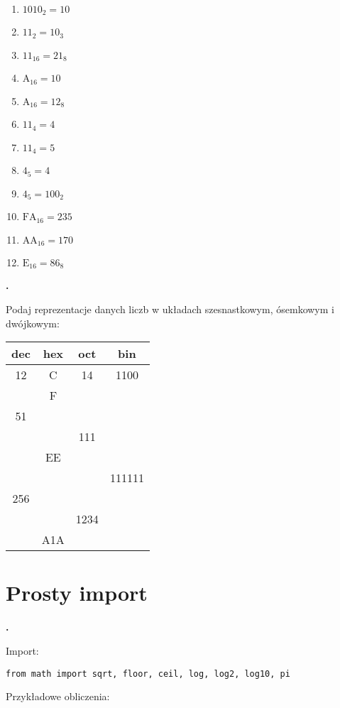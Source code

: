 \documentclass[a4paper]{article}
\begin{document}
\begin{multicols}{2}
\begin{enumerate}[label=\arabic*.]
    \item $1010_{2} = 10$
    \item $11_{2} = 10_{3}$
    \item $11_{16} = 21_{8}$
    \item $\mathrm{A_{16}} = 10$
    \item $\mathrm{A_{16}} = 12_{8}$

    \item $11_{4} = 4$
    \item $11_{4} = 5$
    \item $4_{5} = 4$
    \item $4_{5} = 100_{2}$

    \item $\mathrm{FA_{16}} = 235$
    \item $\mathrm{AA_{16}} = 170$
    \item $\mathrm{E_{16}} = 86_{8}$

\end{enumerate}
\end{multicols}

\textbf{.}\addtocounter{zadanie}{1} Podaj reprezentacje danych liczb w układach szesnastkowym, ósemkowym i dwójkowym:

\begin{tabular}{c | c | c | c}
\textsf{dec} & \textsf{hex} & \textsf{oct} & \textsf{bin}\\\hline
12  & C & 14 & 1100 \\\hline
    & F &    &  \\\hline
51  &   &    &  \\\hline
    &   & 111 & \\\hline
    & EE &  &   \\\hline
    &   &   & 111111 \\\hline
256 &   &   &   \\\hline
    &   & 1234 &    \\\hline
    & A1A &     &   \\

\end{tabular}


\section{Prosty import}

\textbf{.}\addtocounter{zadanie}{1}
Import:
\lstset{numbers=none}
\begin{lstlisting}
from math import sqrt, floor, ceil, log, log2, log10, pi
\end{lstlisting}
Przykładowe obliczenia:
\end{document}
